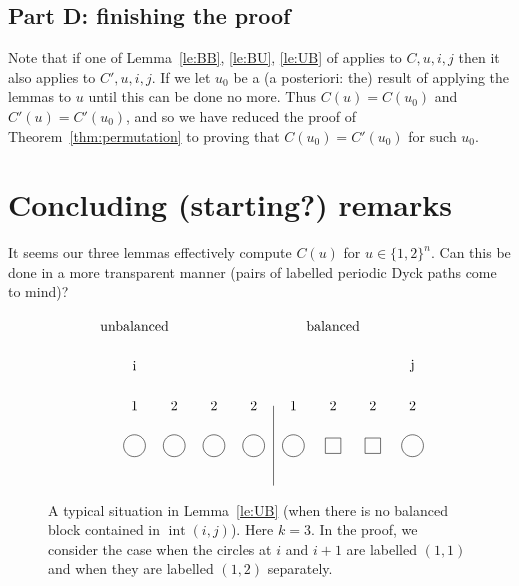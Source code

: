 \documentclass[reqno]{amsart}
\newcommand{\0}{\phantom{c}}
\DeclareMathOperator{\inter}{int} %
\theoremstyle{plain}
\theoremstyle{definition}
\numberwithin{equation}{section}
\begin{document}
\subsection{Part D: finishing the proof}

Note that if one of Lemma~\ref{le:BB}, \ref{le:BU}, \ref{le:UB} of applies to $C,u,i,j$ then it also applies to $C',u,i,j$. If we let $u_0$ be a (a posteriori: the) result of applying the lemmas to $u$ until this can be done no more. Thus $C(u) = C(u_0)$ and $C'(u) = C'(u_0)$, and so we have reduced the proof of Theorem~\ref{thm:permutation} to proving that $C(u_0) = C'(u_0)$ for such $u_0$.








\section{Concluding (starting?) remarks}

It seems our three lemmas effectively compute $C(u)$ for $u \in \{1,2\}^n$. Can this be done in a more transparent manner (pairs of labelled periodic Dyck paths come to mind)?

\vspace{10cm} 

\begin{figure}
\[
\begin{tikzpicture}
  \node at (0, 3){1};
  \node at (1, 3){2};
  \node at (2, 3){2};
  \node at (3, 3){2};
  \node at (4, 3){1};
  \node at (5, 3){2};
  \node at (6, 3){2};
  \node at (7, 3){2};

  \node[circle, draw=black] at (0,2){\0};
  \node[circle, draw=black] at (1,2){\0};
  \node[circle, draw=black] at (2,2){\0};
  \node[circle, draw=black] at (3,2){\0};
  \node[circle, draw=black] at (4,2){\0};
  \node[rectangle, draw=black] at (5,2){\0};
  \node[rectangle, draw=black] at (6,2){\0};
  \node[circle, draw=black] at (7,2){\0};

  \node at (0,5){\textrm{unbalanced}};
  \draw (3.5,1)--(3.5,3);
  \node at (5,5){\textrm{balanced}};
  \node at (0,4){i};
  \node at (7,4){j};
\end{tikzpicture}\]
\caption{A typical situation in Lemma~\ref{le:UB} (when there is no balanced block contained in $\inter(i,j)$). Here $k=3$. In the proof, we consider the case when the circles at $i$ and $i+1$ are labelled $(1,1)$ and when they are labelled $(1,2)$ separately.}
\end{figure}
\end{document}
